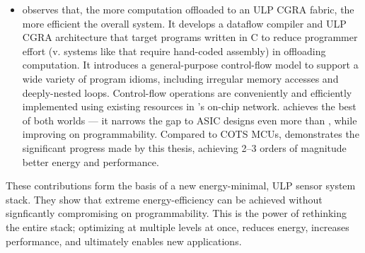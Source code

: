 \begin{itemize}
\item \riptide observes that, the more computation offloaded to an ULP CGRA fabric, the more efficient the overall system.
%
It develops a dataflow compiler and ULP CGRA architecture that target programs written in C to reduce programmer effort (v. systems like \snafu that require hand-coded assembly) in offloading computation.
% 
It introduces a general-purpose control-flow model to support a wide variety of program idioms, including irregular memory accesses and deeply-nested loops.
%
Control-flow operations are conveniently and efficiently implemented using existing resources in \riptide's on-chip network.
% 
% 
% 
\riptide achieves the best of both worlds --- it narrows the gap to ASIC designs even more than \snafu, while improving on programmability.
% 
Compared to COTS MCUs, \riptide demonstrates the significant progress made by this thesis, achieving 2--3 orders of magnitude better energy and performance.

\end{itemize}

These contributions form the basis of a new energy-minimal, ULP sensor system stack.
% 
They show that extreme energy-efficiency can be achieved without signficantly compromising on programmability.
%
This is the power of rethinking the entire stack; optimizing at multiple levels at once, reduces energy, increases performance, and ultimately enables new applications.